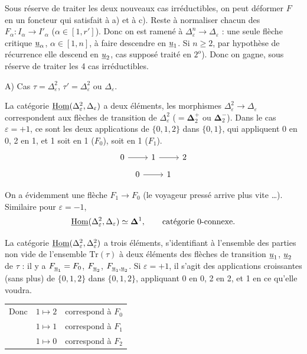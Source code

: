 Sous réserve de traiter les deux nouveaux cas irréductibles, on peut déformer $F$ en un foncteur qui satisfait à a) et à c). Reste à normaliser chacun des $F_\alpha:I_\alpha\longrightarrow I'_\alpha$ ($\alpha\in[1,r']$). Donc on est ramené à $\Delta^n_\varepsilon\longrightarrow\Delta_\varepsilon$ : une seule flèche critique $\underline{u}_\alpha$, $\alpha\in[1,n]$, à faire descendre en $\underline{u}_1$. Si $n\geq2$, par hypothèse de récurrence elle descend en $\underline{u}_2$, cas supposé traité en $2^o$). Donc
on gagne, sous réserve de traiter les 4 cas irréductibles.

A) Cas $\tau=\Delta^2_\varepsilon$, $\tau'=\Delta^2_\varepsilon$ ou $\Delta_\varepsilon$.

La catégorie $\underline{\mathrm{Hom}}(\Delta^2_\varepsilon,\Delta_\varepsilon)$ a deux éléments, les morphismes $\Delta^2_\varepsilon\longrightarrow\Delta_\varepsilon$ correspondent aux flèches de transition de $\Delta^2_\varepsilon$ ($=\mathbf{\Delta}^+_2$ ou $\mathbf{\Delta}^-_2$). Dans le cas $\varepsilon=+1$, ce sont les deux applications de $\{0,1,2\}$ dans $\{0,1\}$, qui appliquent 0 en 0, 2 en 1, et 1 soit en 1 ($F_0$), soit en 1 ($F_1$).
\[
\begin{tikzcd}
0 \arrow[r] & 1 \arrow[r] & 2
\end{tikzcd}
\]
\[
\begin{tikzcd}
0 \arrow[r] & 1
\end{tikzcd}
\]

On a évidemment une flèche $F_1\longrightarrow F_0$ (le voyageur pressé arrive plus vite \ldots). Similaire pour $\varepsilon=-1$,
\[
\underline{\mathrm{Hom}}(\Delta^2_\varepsilon,\Delta_\varepsilon)\simeq\mathbf{\Delta}^1,\qquad\text{catégorie 0-connexe.}
\]

La catégorie $\underline{\mathrm{Hom}}(\Delta^2_\varepsilon,\Delta^2_\varepsilon)$ a trois éléments, s'identifiant à l'ensemble des parties non vide de l'ensemble $\mathrm{Tr}(\tau)$ à deux éléments des flèches de transition $\underline{u}_1$, $\underline{u}_2$ de $\tau$ : il y a $F_{\underline{u}_1}=F_0$, $F_{\underline{u}_2}$, $F_{\underline{u}_1,\underline{u}_2}$. Si $\varepsilon=+1$, il s'agit des applications croissantes (sans plus) de $\{0,1,2\}$ dans $\{0,1,2\}$, appliquant 0 en 0, 2 en 2, et 1 en ce qu'elle voudra. %


\begin{tabular}{lll}
Donc & $1\longmapsto 2$ & correspond à \quad $F_0$\\[1ex]
 & $1\longmapsto 1$ & correspond à \quad $F_1$\\[1ex]
 & $1\longmapsto 0$ & correspond à \quad $F_2$
\end{tabular}

